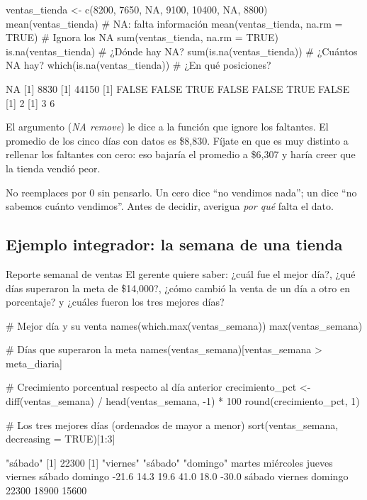 \begin{rcode}
ventas_tienda <- c(8200, 7650, NA, 9100, 10400, NA, 8800)
mean(ventas_tienda)                   # NA: falta información
mean(ventas_tienda, na.rm = TRUE)     # Ignora los NA
sum(ventas_tienda, na.rm = TRUE)
is.na(ventas_tienda)                  # ¿Dónde hay NA?
sum(is.na(ventas_tienda))             # ¿Cuántos NA hay?
which(is.na(ventas_tienda))           # ¿En qué posiciones?
\end{rcode}
\begin{rsalida}
[1] NA
[1] 8830
[1] 44150
[1] FALSE FALSE  TRUE FALSE FALSE  TRUE FALSE
[1] 2
[1] 3 6
\end{rsalida}

El argumento  (\emph{NA remove}) le dice a la función
que ignore los faltantes. El promedio de los cinco días con datos es
\$8,830. Fíjate en que es muy distinto a rellenar los faltantes con cero:
eso bajaría el promedio a \$6,307 y haría creer que la tienda vendió peor.

\begin{advertencia}
No reemplaces  por 0 sin pensarlo. Un cero dice ``no vendimos
nada''; un  dice ``no sabemos cuánto vendimos''. Antes de decidir,
averigua \emph{por qué} falta el dato.
\end{advertencia}

\subsection{Ejemplo integrador: la semana de una tienda}

\begin{ejemplo}{Reporte semanal de ventas}
El gerente quiere saber: ¿cuál fue el mejor día?, ¿qué días superaron la
meta de \$14,000?, ¿cómo cambió la venta de un día a otro en porcentaje? y
¿cuáles fueron los tres mejores días?
\end{ejemplo}

\begin{rcode}
# Mejor día y su venta
names(which.max(ventas_semana))
max(ventas_semana)

# Días que superaron la meta
names(ventas_semana)[ventas_semana > meta_diaria]

# Crecimiento porcentual respecto al día anterior
crecimiento_pct <- diff(ventas_semana) / head(ventas_semana, -1) * 100
round(crecimiento_pct, 1)

# Los tres mejores días (ordenados de mayor a menor)
sort(ventas_semana, decreasing = TRUE)[1:3]
\end{rcode}
\begin{rsalida}
[1] "sábado"
[1] 22300
[1] "viernes" "sábado"  "domingo"
   martes miércoles    jueves   viernes    sábado   domingo 
    -21.6      14.3      19.6      41.0      18.0     -30.0 
 sábado viernes domingo 
  22300   18900   15600 
\end{rsalida}


